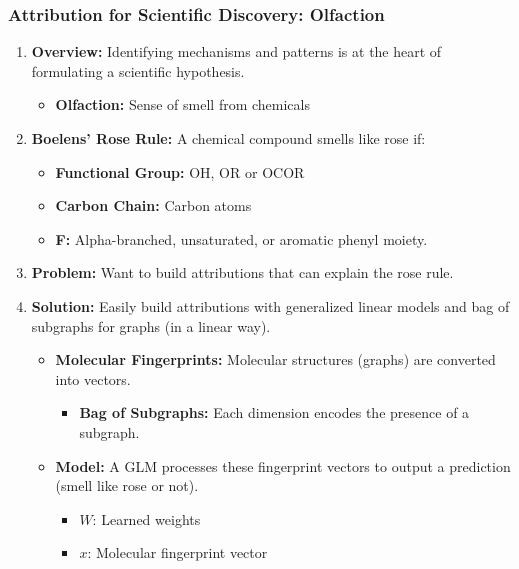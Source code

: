 \subsubsection{Attribution for Scientific Discovery: Olfaction}
\begin{example} 
    \begin{enumerate}
        \item \textbf{Overview:} Identifying mechanisms and patterns is at the heart of formulating a scientific hypothesis.
        \begin{itemize}
            \item \textbf{Olfaction:} Sense of smell from chemicals 
        \end{itemize}
        \item \textbf{Boelens' Rose Rule:} A chemical compound smells like rose if: 
        \begin{itemize}
            \item \textbf{Functional Group:} OH, OR or OCOR
            \item \textbf{Carbon Chain:} Carbon atoms
            \item \textbf{F:} Alpha-branched, unsaturated, or aromatic phenyl moiety. 
        \end{itemize}
        \item \textbf{Problem:} Want to build attributions that can explain the rose rule.
        \item \textbf{Solution:} Easily build attributions with generalized linear models and bag of subgraphs for graphs (in a linear way).
        \begin{itemize}
            \item \textbf{Molecular Fingerprints:} Molecular structures (graphs) are converted into vectors.
            \begin{itemize}
                \item \textbf{Bag of Subgraphs:} Each dimension encodes the presence of a subgraph.
            \end{itemize}
            \item \textbf{Model:} A GLM processes these fingerprint vectors to output a prediction (smell like rose or not).
            \begin{itemize}
                \item $W$: Learned weights 
                \item $x$: Molecular fingerprint vector

\end{itemize}
\end{itemize}
\end{enumerate}
\end{example}
